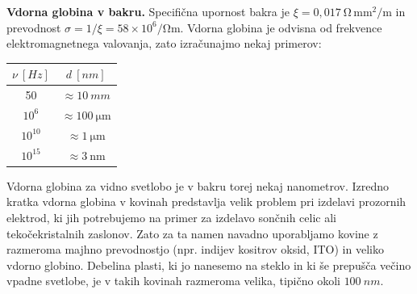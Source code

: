 \begin{example}{\bf Vdorna globina v bakru.}
Specifična upornost bakra je $\xi = 0,017~\si{\ohm\,\milli\metre^2/\metre}$ in 
prevodnost $\sigma = 1/\xi = 58 \times 10^6/\si{\ohm\metre}$. 
Vdorna globina je odvisna od frekvence elektro\-mag\-net\-nega valovanja, 
zato izračunajmo nekaj primerov: 
\begin{center}
\begin{tabular}{|c|c|}
\hline
$\nu~[\si{Hz}]$ & $d~[\si{nm}]$\\ \hline
50 & $\approx 10~\si{mm}$\\ \hline
$10^6$ & $\approx 100~\si{\micro\metre}$\\ \hline
$10^{10}$ & $\approx 1~\si{\micro\metre}$\\ \hline
$10^{15}$ & $\approx 3~\si{\nano\metre}$\\ \hline
\end{tabular}
\end{center}

Vdorna globina za vidno svetlobo je v bakru torej nekaj nanometrov. 
Izredno kratka vdorna globina v kovinah predstavlja velik problem pri izdelavi prozornih elektrod, 
ki jih potrebujemo na primer za izdelavo sončnih celic
ali tekočekristalnih zaslonov. Zato za ta namen navadno uporabljamo
kovine z razmeroma majhno prevodnostjo (npr. indijev 
kositrov oksid, ITO) in veliko vdorno globino. Debelina plasti, ki
jo nanesemo na steklo in ki še prepušča večino vpadne svetlobe, je 
v takih kovinah razmeroma velika, tipično 
okoli $100~\si{nm}$. 
\end{example}
